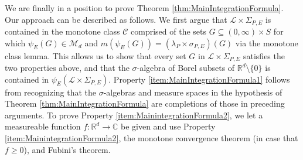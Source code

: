 \documentclass[11pt, letter]{book}
\begin{document}
\noindent We are finally in a position to prove Theorem \ref{thm:MainIntegrationFormula}. Our approach can be described as follows. We first argue that $\mathcal{L}\times \Sigma_{P,E}$ is contained in the monotone class $\mathcal{C}$ comprised of the sets $G\subseteq (0,\infty)\times S$ for which $\psi_E(G) \in \mathcal{M}_d$ and $m(\psi_E(G)) = (\lambda_P \times \sigma_{P,E})(G)$ via the monotone class lemma. This allows us to show that every set $G$ in $\mathcal{L}\times \Sigma_{P,E}$ satisfies the two properties above, and that the $\sigma$-algebra of Borel subsets of $\mathbb{R}^d\setminus\{ 0\}$ is contained in $\psi_E(\mathcal{L}\times \Sigma_{P,E})$. Property \ref{item:MainIntegrationFormula1} follows from recognizing that the $\sigma$-algebras and measure spaces in the hypothesis of Theorem \ref{thm:MainIntegrationFormula} are completions of those in preceding arguments. To prove Property \ref{item:MainintegrationFormula2}, we let a measureable function $f: \mathbb{R}^d \to \mathbb{C}$ be given and use Property \ref{item:MainintegrationFormula2}, the monotone convergence theorem (in case that $f\geq 0$), and Fubini's theorem.   
 
\end{document}
